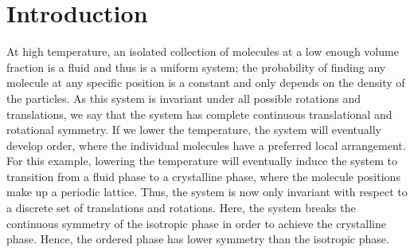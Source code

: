 \chapter{Introduction}\label{c:1}
At high temperature, an isolated collection of molecules at a low enough volume fraction is a fluid and thus is a uniform system; the probability of finding any molecule at any specific position is a constant and only depends on the density of the particles.
As this system is invariant under all possible rotations and translations, we say that the system has complete continuous translational and rotational symmetry.
If we lower the temperature, the system will eventually develop order, where the individual molecules have a preferred local arrangement.
For this example, lowering the temperature will eventually induce the system to transition from a fluid phase to a crystalline phase, where the molecule positions make up a periodic lattice.
Thus, the system is now only invariant with respect to a discrete set of translations and rotations.
Here, the system breaks the continuous symmetry of the isotropic phase in order to achieve the crystalline phase.
Hence, the ordered phase has lower symmetry than the isotropic phase.

